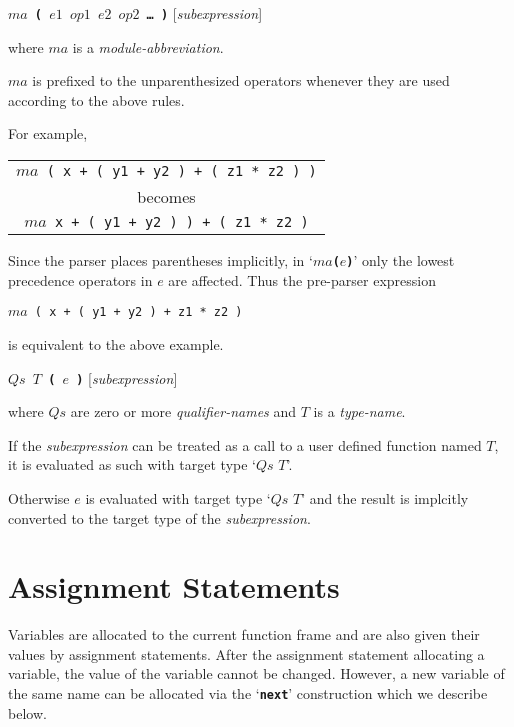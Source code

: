 \documentclass[12pt]{article}
\newcommand{\TT}[1]{{\tt \bfseries #1}}
\newenvironment{indpar}[1][0.3in]%
	{\begin{list}{}%
		     {\setlength{\itemsep}{0in}%
		      \setlength{\topsep}{0in}%
		      \setlength{\parsep}{1ex}%
		      \setlength{\labelwidth}{#1}%
		      \setlength{\leftmargin}{#1}%
		      \addtolength{\leftmargin}{\labelsep}}%
	 \item}%
	{\end{list}}
\begin{document}
\TT{$ma$ ( $e1$ $op1$ $e2$ $op2$ \ldots{} )}
\hfill [{\em subexpression}]
\label{MODULE-ABBREVIATION-SEMANTICS}
\begin{indpar}
where $ma$ is a {\em module-abbreviation}.

$ma$ is prefixed to the unparenthesized
operators whenever they are used according to the above
rules.

For example,
\begin{center}
\begin{tabular}{c}
{\tt $ma$ ( x + ( y1 + y2 ) + ( z1 * z2 ) )} \\
becomes \\
{\tt $ma$ x + ( y1 + y2 ) ) + ( z1 * z2 )}
\end{tabular}
\end{center}

Since the parser places parentheses implicitly, in `\TT{$ma$($e$)}'
only the lowest precedence operators in $e$ are affected.
Thus the pre-parser expression
\begin{center}
{\tt $ma$ ( x + ( y1 + y2 ) + z1 * z2 )} \\
\end{center}
is equivalent to the above example.

\end{indpar}

\TT{$Qs$ $T$ ( $e$ )}
\hfill [{\em subexpression}]
\begin{indpar}
where $Qs$ are zero or more {\em qualifier-names} and $T$ is a {\em type-name}.

If the {\em subexpression} can be treated as a call to a
user defined function named $T$, it is evaluated as such with
target type `$Qs$ $T$'.

Otherwise $e$ is evaluated with target type `$Qs$ $T$'
and the result is implcitly
converted to the target type of the {\em subexpression}.
\end{indpar}

\section{Assignment Statements}
\label{ASSIGNMENT-STATEMENTS}

Variables are allocated to the current function frame
and are also given their values by assignment statements.
After the assignment statement allocating a variable,
the value of the variable cannot be changed.  However,
a new variable of the same name can be allocated via
the `\TT{next}' construction which we describe below.
\end{document}
